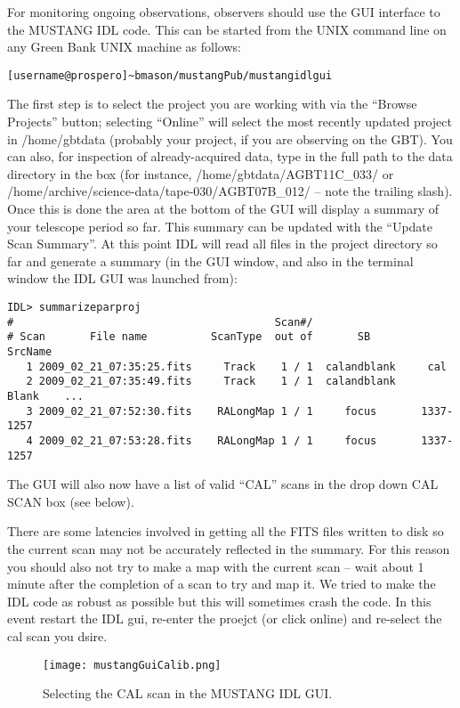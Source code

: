For monitoring ongoing observations, observers should use the GUI interface
to the MUSTANG IDL code. This can be started from the UNIX command line
on any Green Bank UNIX machine as follows:
\begin{lstlisting}
[username@prospero]~bmason/mustangPub/mustangidlgui
\end{lstlisting}

The first step is to select the project you are working with via the
``Browse Projects'' button; selecting ``Online'' will select the most
recently updated project in /home/gbtdata (probably your project, if
you are observing on the GBT). You can also, for inspection of
already-acquired data, type in the full path to the data directory in
the box (for instance, /home/gbtdata/AGBT11C\_033/ or
/home/archive/science-data/tape-030/AGBT07B\_012/ -- note the trailing
slash).  Once this is done the area at the bottom of the GUI will
display a summary of your telescope period so far. This summary can be
updated with the ``Update Scan Summary''.  At this point IDL will
read all files in the project directory so far and generate a summary
(in the GUI window, and also in the terminal window the IDL GUI was
launched from):
\begin{lstlisting}
IDL> summarizeparproj
#                                         Scan#/                           
# Scan       File name          ScanType  out of       SB       SrcName     
   1 2009_02_21_07:35:25.fits     Track    1 / 1  calandblank     cal      
   2 2009_02_21_07:35:49.fits     Track    1 / 1  calandblank     Blank    ...
   3 2009_02_21_07:52:30.fits    RALongMap 1 / 1     focus       1337-1257 
   4 2009_02_21_07:53:28.fits    RALongMap 1 / 1     focus       1337-1257 
\end{lstlisting}
The GUI will also now have a list of valid ``CAL'' scans in the drop
down CAL SCAN box (see below).


There are some latencies involved in getting all the FITS files
written to disk so the current scan may not be accurately reflected in
the summary. For this reason you should also not try to make a map
with the current scan -- wait about 1 minute after the completion of a
scan to try and map it. We tried to make the IDL code as robust as
possible but this will sometimes crash the code. In this event restart
the IDL gui, re-enter the proejct (or click online) and re-select the
cal scan you dsire. 

\begin{figure}
\texttt{[image: mustangGuiCalib.png]}
\caption{Selecting the CAL scan in the MUSTANG IDL GUI.}
\label{fig:calgui}
\end{figure}

